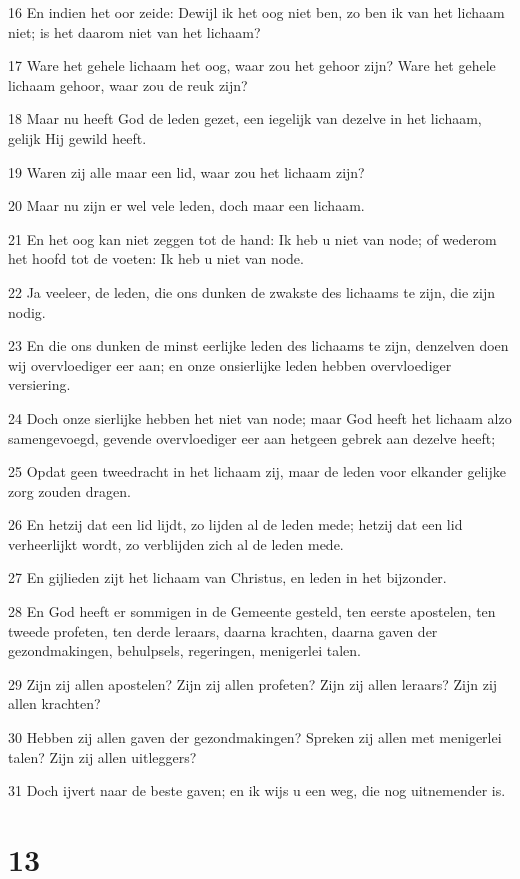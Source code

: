 \par 16 En indien het oor zeide: Dewijl ik het oog niet ben, zo ben ik van het lichaam niet; is het daarom niet van het lichaam?
\par 17 Ware het gehele lichaam het oog, waar zou het gehoor zijn? Ware het gehele lichaam gehoor, waar zou de reuk zijn?
\par 18 Maar nu heeft God de leden gezet, een iegelijk van dezelve in het lichaam, gelijk Hij gewild heeft.
\par 19 Waren zij alle maar een lid, waar zou het lichaam zijn?
\par 20 Maar nu zijn er wel vele leden, doch maar een lichaam.
\par 21 En het oog kan niet zeggen tot de hand: Ik heb u niet van node; of wederom het hoofd tot de voeten: Ik heb u niet van node.
\par 22 Ja veeleer, de leden, die ons dunken de zwakste des lichaams te zijn, die zijn nodig.
\par 23 En die ons dunken de minst eerlijke leden des lichaams te zijn, denzelven doen wij overvloediger eer aan; en onze onsierlijke leden hebben overvloediger versiering.
\par 24 Doch onze sierlijke hebben het niet van node; maar God heeft het lichaam alzo samengevoegd, gevende overvloediger eer aan hetgeen gebrek aan dezelve heeft;
\par 25 Opdat geen tweedracht in het lichaam zij, maar de leden voor elkander gelijke zorg zouden dragen.
\par 26 En hetzij dat een lid lijdt, zo lijden al de leden mede; hetzij dat een lid verheerlijkt wordt, zo verblijden zich al de leden mede.
\par 27 En gijlieden zijt het lichaam van Christus, en leden in het bijzonder.
\par 28 En God heeft er sommigen in de Gemeente gesteld, ten eerste apostelen, ten tweede profeten, ten derde leraars, daarna krachten, daarna gaven der gezondmakingen, behulpsels, regeringen, menigerlei talen.
\par 29 Zijn zij allen apostelen? Zijn zij allen profeten? Zijn zij allen leraars? Zijn zij allen krachten?
\par 30 Hebben zij allen gaven der gezondmakingen? Spreken zij allen met menigerlei talen? Zijn zij allen uitleggers?
\par 31 Doch ijvert naar de beste gaven; en ik wijs u een weg, die nog uitnemender is.

\chapter{13}

